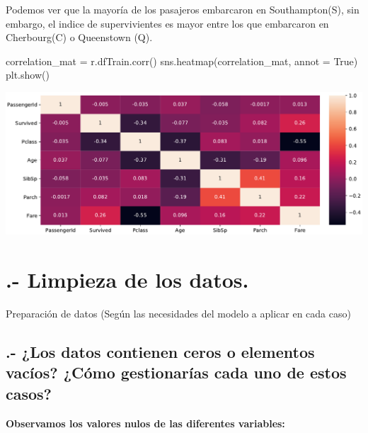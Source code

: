 \documentclass[
]{article}
\newenvironment{Shaded}{\begin{snugshade}}{\end{snugshade}}
\newcommand{\CommentTok}[1]{\textcolor[rgb]{0.50,0.62,0.50}{#1}}
\newcommand{\KeywordTok}[1]{\textcolor[rgb]{0.94,0.87,0.69}{#1}}
\newcommand{\NormalTok}[1]{\textcolor[rgb]{0.80,0.80,0.80}{#1}}
\newcommand{\OperatorTok}[1]{\textcolor[rgb]{0.94,0.94,0.82}{#1}}
\newcommand{\StringTok}[1]{\textcolor[rgb]{0.80,0.58,0.58}{#1}}
\newcommand{\VariableTok}[1]{\textcolor[rgb]{0.80,0.80,0.80}{#1}}
\begin{document}
Podemos ver que la mayoría de los pasajeros embarcaron en
Southampton(S), sin embargo, el indice de supervivientes es mayor entre
los que embarcaron en Cherbourg(C) o Queenstown (Q).

\begin{Shaded}
\begin{Highlighting}[]
\NormalTok{correlation_mat }\OperatorTok{=}\NormalTok{ r.dfTrain.corr()}
\NormalTok{sns.heatmap(correlation_mat, annot }\OperatorTok{=} \VariableTok{True}\NormalTok{)}
\NormalTok{plt.show()}
\end{Highlighting}
\end{Shaded}

\includegraphics{m2851_PRA2_aruizplaza_rcotillas_files/figure-latex/unnamed-chunk-13-1.pdf}

\hypertarget{limpieza-de-los-datos.}{%
\section{.- Limpieza de los datos.}\label{limpieza-de-los-datos.}}

Preparación de datos (Según las necesidades del modelo a aplicar en cada
caso)

\hypertarget{los-datos-contienen-ceros-o-elementos-vacuxedos-cuxf3mo-gestionaruxedas-cada-uno-de-estos-casos}{%
\subsection{.- ¿Los datos contienen ceros o elementos vacíos? ¿Cómo
gestionarías cada uno de estos
casos?}\label{los-datos-contienen-ceros-o-elementos-vacuxedos-cuxf3mo-gestionaruxedas-cada-uno-de-estos-casos}}

\textbf{Observamos los valores nulos de las diferentes variables:}

\begin{Shaded}
\end{Shaded}
\end{document}
